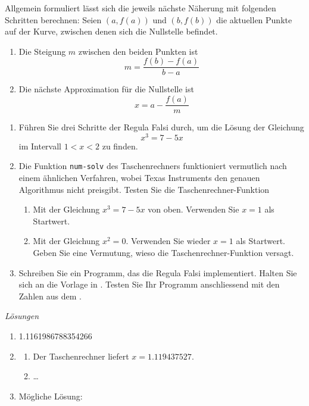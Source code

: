 Allgemein formuliert lässt sich die jeweils nächste Näherung mit folgenden Schritten berechnen: Seien $(a,f(a))$ und $(b, f(b))$ die aktuellen Punkte auf der Kurve, zwischen denen sich die Nullstelle befindet.
\begin{enumerate}
	\item Die Steigung $m$ zwischen den beiden Punkten ist
	      \[m = \frac{f(b)-f(a)}{b-a}\]
	\item Die nächste Approximation für die Nullstelle ist
	      \[x = a - \frac{f(a)}{m}\] %
\end{enumerate}

\begin{ueb}
	{}{}
	\begin{enumerate}
		\item Führen Sie drei Schritte der Regula Falsi durch, um die Lösung der Gleichung
		      \[x^3 = 7-5x\]
		      im Intervall $1<x<2$ zu finden.
		\item Die Funktion \texttt{num-solv} des Taschenrechners funktioniert vermutlich nach einem ähnlichen Verfahren, wobei Texas Instruments den genauen Algorithmus nicht preisgibt. Testen Sie die Taschenrechner-Funktion
		      \begin{enumerate}
			      \item Mit der Gleichung  \(x^3 = 7-5x\) von oben. Verwenden Sie $x=1$ als Startwert.
			      \item Mit der Gleichung \(x^2 = 0\). Verwenden Sie wieder $x=1$ als Startwert. Geben Sie eine Vermutung, wieso die Taschenrechner-Funktion versagt.
		      \end{enumerate}
		\item Schreiben Sie ein Programm, das die Regula Falsi implementiert. Halten Sie sich an die Vorlage in . Testen Sie Ihr Programm anschliessend mit den Zahlen aus dem .
	\end{enumerate}
\end{ueb}

\clearpage
\emph{Lösungen}
\begin{enumerate}
	\item 1.1161986788354266
	\item  \begin{enumerate}
		      \item Der Taschenrechner liefert $x=1.119437527$.
		      \item \dots %
	      \end{enumerate}
	\item Mögliche Lösung:
	      
\end{enumerate}

















